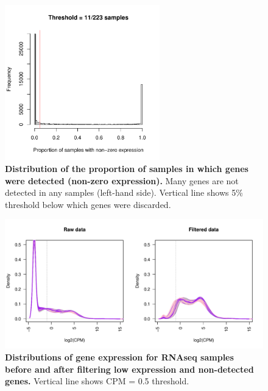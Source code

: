 \begin{figure}
    \centering
    \includegraphics[width=0.6\textwidth, page=1]{mainmatter/figures/chapter_02/rnaseq_data_setup.gene_zero_prop.pdf}
    \caption{
        \textbf{Distribution of the proportion of samples in which genes were detected (non-zero expression).}
        Many genes are not detected in any samples (left-hand side). 
        Vertical line shows 5\% threshold below which genes were discarded.
    }
    \label{fig:hird_rnaseq_filtering_zeroProp}
\end{figure}

\begin{figure}
    \includegraphics[width=1.0\textwidth]{mainmatter/figures/chapter_02/rnaseq_data_setup.sample_cpm_density_filtered.pdf}
    \caption{
        \textbf{Distributions of gene expression for \gls{RNAseq} samples before and after filtering low expression and non-detected genes.}
        Vertical line shows \gls{CPM} = 0.5 threshold.
    }
    \label{fig:hird_rnaseq_cpm_filtering}
\end{figure}

